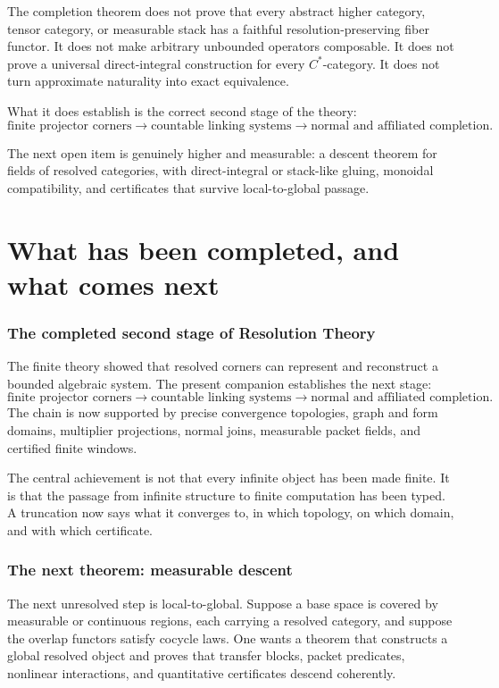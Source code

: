 \documentclass[11pt]{article}
\theoremstyle{definition}
\theoremstyle{remark}
\begin{document}
The completion theorem does not prove that every abstract higher category, tensor category, or measurable stack has a faithful resolution-preserving fiber functor.  It does not make arbitrary unbounded operators composable.  It does not prove a universal direct-integral construction for every $C^*$-category.  It does not turn approximate naturality into exact equivalence.

What it does establish is the correct second stage of the theory:
\[
\boxed{
\text{finite projector corners}
\longrightarrow
\text{countable linking systems}
\longrightarrow
\text{normal and affiliated completion}.
}
\]

The next open item is genuinely higher and measurable: a descent theorem for fields of resolved categories, with direct-integral or stack-like gluing, monoidal compatibility, and certificates that survive local-to-global passage.


\part{What has been completed, and what comes next}

\section{The completed second stage of Resolution Theory}
The finite theory showed that resolved corners can represent and reconstruct a bounded algebraic system.  The present companion establishes the next stage:
\[
\boxed{
\text{finite projector corners}
\longrightarrow
\text{countable linking systems}
\longrightarrow
\text{normal and affiliated completion}.
}
\]
The chain is now supported by precise convergence topologies, graph and form domains, multiplier projections, normal joins, measurable packet fields, and certified finite windows.

The central achievement is not that every infinite object has been made finite.  It is that the passage from infinite structure to finite computation has been typed.  A truncation now says what it converges to, in which topology, on which domain, and with which certificate.

\section{The next theorem: measurable descent}
The next unresolved step is local-to-global.  Suppose a base space is covered by measurable or continuous regions, each carrying a resolved category, and suppose the overlap functors satisfy cocycle laws.  One wants a theorem that constructs a global resolved object and proves that transfer blocks, packet predicates, nonlinear interactions, and quantitative certificates descend coherently.
\end{document}
